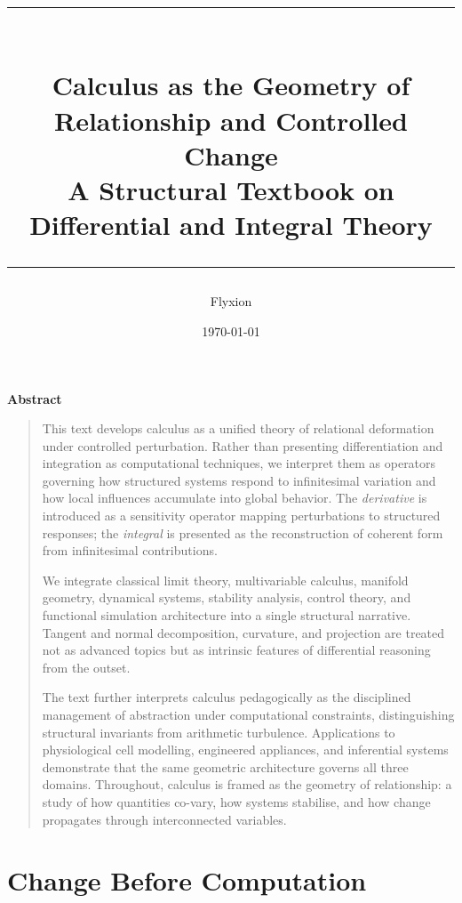 \documentclass[12pt,openany]{book}
\title{%
  \vspace{-1cm}
  {\color{NavyBlue}\rule{\linewidth}{1.5pt}}\\[0.6em]
  \textbf{\Huge Calculus as the Geometry of\\[0.3em]
  Relationship and Controlled Change}\\[0.4em]
  {\large A Structural Textbook on Differential and Integral Theory}\\[0.3em]
  {\color{NavyBlue}\rule{\linewidth}{1.5pt}}
}
\author{Flyxion}
\date{\today}
\begin{document}
\maketitle
\thispagestyle{empty}

\clearpage
\begin{center}
  {\large\bfseries\color{NavyBlue} Abstract}
\end{center}
\begin{quote}
This text develops calculus as a unified theory of relational deformation under
controlled perturbation. Rather than presenting differentiation and integration
as computational techniques, we interpret them as operators governing how
structured systems respond to infinitesimal variation and how local influences
accumulate into global behavior. The \emph{derivative} is introduced as a
sensitivity operator mapping perturbations to structured responses; the
\emph{integral} is presented as the reconstruction of coherent form from
infinitesimal contributions.

We integrate classical limit theory, multivariable calculus, manifold geometry,
dynamical systems, stability analysis, control theory, and functional simulation
architecture into a single structural narrative. Tangent and normal
decomposition, curvature, and projection are treated not as advanced topics but
as intrinsic features of differential reasoning from the outset.

The text further interprets calculus pedagogically as the disciplined management
of abstraction under computational constraints, distinguishing structural
invariants from arithmetic turbulence. Applications to physiological cell
modelling, engineered appliances, and inferential systems demonstrate that the
same geometric architecture governs all three domains. Throughout, calculus is
framed as the geometry of relationship: a study of how quantities co-vary, how
systems stabilise, and how change propagates through interconnected variables.
\end{quote}

\tableofcontents

\chapter{Change Before Computation}
\label{ch:change}
\end{document}
